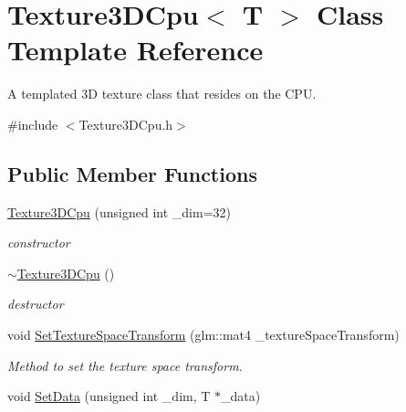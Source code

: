 \hypertarget{classTexture3DCpu}{}\section{Texture3\+D\+Cpu$<$ T $>$ Class Template Reference}
\label{classTexture3DCpu}


A templated 3D texture class that resides on the C\+PU.  




{\ttfamily \#include $<$Texture3\+D\+Cpu.\+h$>$}

\subsection*{Public Member Functions}
\begin{DoxyCompactItemize}
\item 
\hyperlink{classTexture3DCpu_aeb7c0040fa28ee23757fc2c5ecf5d6d5}{Texture3\+D\+Cpu} (unsigned int \+\_\+dim=32)\hypertarget{classTexture3DCpu_aeb7c0040fa28ee23757fc2c5ecf5d6d5}{}\label{classTexture3DCpu_aeb7c0040fa28ee23757fc2c5ecf5d6d5}

\begin{DoxyCompactList}\small\item\em constructor \end{DoxyCompactList}\item 
\hyperlink{classTexture3DCpu_aa28ae9d7a55b9d0a7ab2444ff43bbb81}{$\sim$\+Texture3\+D\+Cpu} ()\hypertarget{classTexture3DCpu_aa28ae9d7a55b9d0a7ab2444ff43bbb81}{}\label{classTexture3DCpu_aa28ae9d7a55b9d0a7ab2444ff43bbb81}

\begin{DoxyCompactList}\small\item\em destructor \end{DoxyCompactList}\item 
void \hyperlink{classTexture3DCpu_ad521dc0ac97707d4f85a4b2091da9489}{Set\+Texture\+Space\+Transform} (glm\+::mat4 \+\_\+texture\+Space\+Transform)\hypertarget{classTexture3DCpu_ad521dc0ac97707d4f85a4b2091da9489}{}\label{classTexture3DCpu_ad521dc0ac97707d4f85a4b2091da9489}

\begin{DoxyCompactList}\small\item\em Method to set the texture space transform. \end{DoxyCompactList}\item 
void \hyperlink{classTexture3DCpu_a21a57d5971365044f719e7155c267d9b}{Set\+Data} (unsigned int \+\_\+dim, T $\ast$\+\_\+data)\hypertarget{classTexture3DCpu_a21a57d5971365044f719e7155c267d9b}{}\label{classTexture3DCpu_a21a57d5971365044f719e7155c267d9b}


\end{DoxyCompactItemize}
